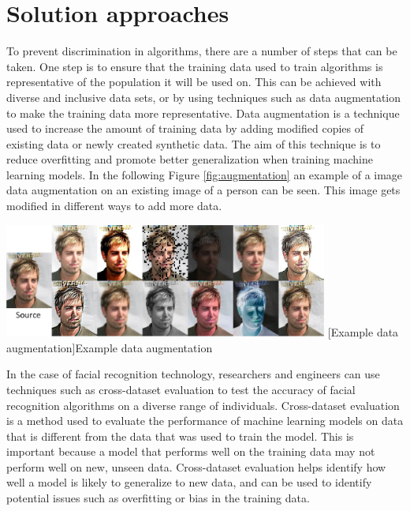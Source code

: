 \documentclass[
	12pt,
    a4paper,
    egregdoesnotlikesansseriftitles, %
    toc=chapterentrywithdots,
    oneside, openany,
    titlepage,
    parskip=half,
    headings=normal,  %
    listof=totoc,
    bibliography=totocnumbered,
    index=totoc,
    captions=tableheading,  %
    listof=flat,
    numbers=noenddot, %
    final]
    {scrbook}
\begin{document}
\chapter{Solution approaches}
To prevent discrimination in algorithms, there are a number of steps that can be taken. 
One step is to ensure that the training data used to train algorithms is representative of the population it will be used on. 
This can be achieved with diverse and inclusive data sets, or by using techniques such as data augmentation to make the training data more representative.
Data augmentation is a technique used to increase the amount of training data by adding modified copies of existing data or newly created synthetic data.
The aim of this technique is to reduce overfitting and promote better generalization when training machine learning models. \cite[p. 2]{nanni2022feature}
In the following Figure \ref{fig:augmentation} an example of a image data augmentation on an existing image of a person can be seen. 
This image gets modified in different ways to add more data.

\vspace{1em}
\begin{minipage}{\linewidth}
	\centering
	\includegraphics[width=0.8\textwidth]{figures/augmentation2.jpg}
	[Example data augmentation]{Example data augmentation \cite{singh_face_2020}}
	\label{fig:augmentation}
\end{minipage}



In the case of facial recognition technology, researchers and engineers can use techniques such as cross-dataset evaluation to test the accuracy of facial recognition algorithms on a diverse range of individuals. 
Cross-dataset evaluation is a method used to evaluate the performance of machine learning models on data that is different from the data that was used to train the model.
This is important because a model that performs well on the training data may not perform well on new, unseen data.
Cross-dataset evaluation helps identify how well a model is likely to generalize to new data, and can be used to identify potential issues such as overfitting or bias in the training data. \cite[p. 1-2]{yang_cross-datasets_2022} \cite[p. 3679-3680]{chen_cdevalsumm_2020}
\end{document}
